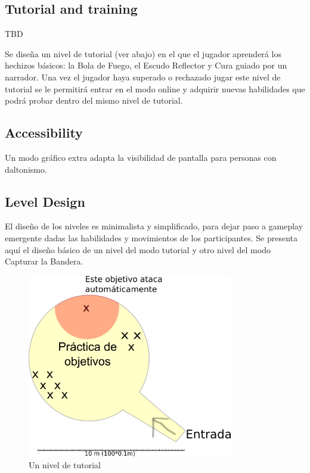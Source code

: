 \documentclass[12pt]{report}
\begin{document}
\subsection{Tutorial and training}

TBD

Se diseña un nivel de tutorial (ver abajo) en el que el jugador aprenderá los hechizos básicos: la Bola de Fuego, el Escudo Reflector y Cura guiado por un narrador. Una vez el jugador haya superado o rechazado jugar este nivel de tutorial se le permitirá entrar en el modo online y adquirir nuevas habilidades que podrá probar dentro del mismo nivel de tutorial.

\subsection{Accessibility}

Un modo gráfico extra adapta la visibilidad de pantalla para personas con daltonismo.

\subsection{Level Design}

El diseño de los niveles es minimalista y simplificado, para dejar paso a gameplay emergente dadas las habilidades y movimientos de los participantes. Se presenta aquí el diseño básico de un nivel del modo tutorial y otro nivel del modo Capturar la Bandera.

\begin{figure}[H]
    \centering
    \includegraphics[width=0.8\textwidth]{tutorial}
    \caption{Un nivel de tutorial}
\end{figure}
\end{document}

